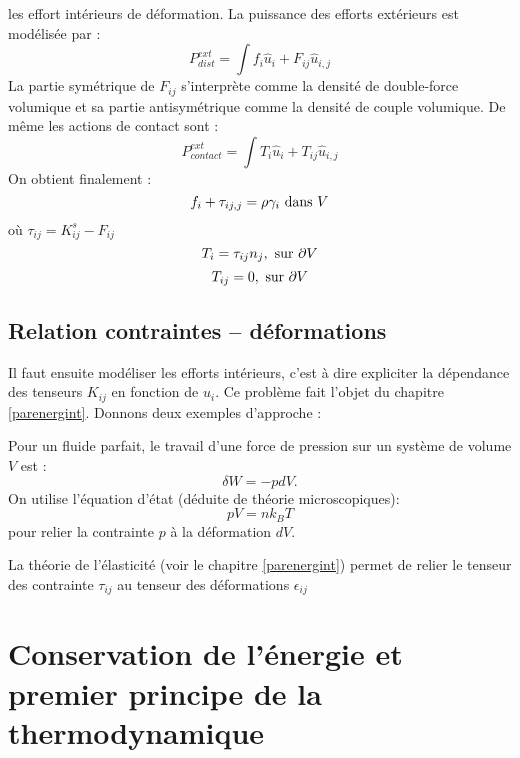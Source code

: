 \documentclass[12pt]{book}
\begin{document}
les effort int\'erieurs de d\'eformation.
La puissance des efforts ext\'erieurs est mod\'elis\'ee par :
\begin{equation}
P^{ext}_{dist}=\int f_i\hat{u}_i+F_{ij}\hat{u}_{i,j}
\end{equation}
La partie sym\'etrique de $F_{ij}$ s'interpr\`ete comme la densit\'e
de double-force volumique et sa partie antisym\'etrique comme la
densit\'e de couple volumique. De m\^eme les actions de contact sont :
\begin{equation}
P^{ext}_{contact}=\int T_i\hat{u}_i+T_{ij}\hat{u}_{i,j}
\end{equation}
On obtient finalement :
\begin{equation}
f_i+\tau_{ij,j}=\rho \gamma_i\ {\rm dans}\ V
\end{equation}
o\`u $\tau_{ij}=K_{ij}^s-F_{ij}$
\begin{equation}
T_i=\tau_{ij}n_j,\ {\rm sur}\ \partial V
\end{equation}
\begin{equation}
T_{ij}=0,\ {\rm sur}\ \partial V
\end{equation}
\subsection{Relation contraintes -- d\'eformations}
Il faut ensuite mod\'eliser les efforts int\'erieurs, c'est \`a dire
expliciter la d\'ependance des tenseurs $K_{ij}$ en fonction de $u_i$.
Ce probl\`eme fait l'objet du chapitre \ref{parenergint}.
Donnons deux exemples d'approche :
\begin{exmp}
Pour un fluide parfait, le travail d'une force de pression sur un syst\`eme de
volume $V$ est :
\begin{equation}
\delta W=-pdV.
\end{equation}
On utilise l'\'equation d'\'etat
(d\'eduite de th\'eorie microscopiques):
\begin{equation}
pV=nk_BT
\end{equation}
pour relier la contrainte $p$ \`a la d\'eformation $dV$.
\end{exmp}
\begin{exmp}
La th\'eorie de l'\'elasticit\'e (voir le chapitre \ref{parenergint})
permet de relier le tenseur des 
contrainte $\tau_{ij}$ au tenseur des d\'eformations $\epsilon_{ij}$ 
\end{exmp}
\section[Conservation de l'\'energie]{Conservation de l'\'energie et
premier principe de la thermodynamique} \label{secpremierprinci}
\end{document}
